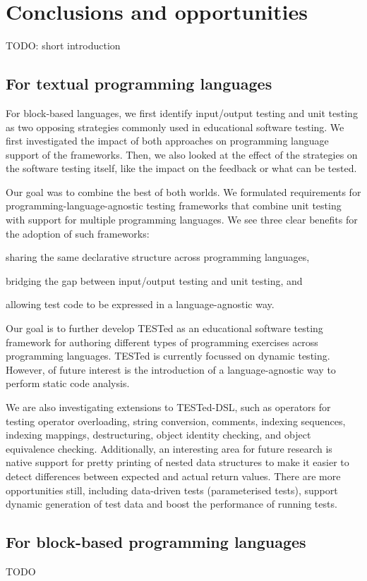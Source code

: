 \documentclass[main]{subfiles}
\begin{document}
\chapter{Conclusions and opportunities}\label{ch:conclusions-and-opportunities}

TODO: short introduction

\section{For textual programming languages}\label{sec:for-textual-programming-languages}

For block-based languages, we first identify input/output testing and unit testing as two opposing strategies commonly used in educational software testing.
We first investigated the impact of both approaches on programming language support of the frameworks.
Then, we also looked at the effect of the strategies on the software testing itself, like the impact on the feedback or what can be tested.

Our goal was to combine the best of both worlds.
We formulated requirements for programming-language-agnostic testing frameworks that combine unit testing with support for multiple programming languages.
We see three clear benefits for the adoption of such frameworks: \begin{enumerate*}[label=\emph{\roman*})] \item sharing the same declarative structure across programming languages, \item bridging the gap between input/output testing and unit testing, and \item allowing test code to be expressed in a language-agnostic way.\end{enumerate*}

Our goal is to further develop TESTed as an educational software testing framework for authoring different types of programming exercises across programming languages.
TESTed is currently focussed on dynamic testing.
However, of future interest is the introduction of a language-agnostic way to perform static code analysis.

We are also investigating extensions to TESTed-DSL, such as operators for testing operator overloading, string conversion, comments, indexing sequences, indexing mappings, destructuring, object identity checking, and object equivalence checking.
Additionally, an interesting area for future research is native support for pretty printing of nested data structures to make it easier to detect differences between expected and actual return values.
There are more opportunities still, including data-driven tests (parameterised tests), support dynamic generation of test data and boost the performance of running tests.

\section{For block-based programming languages}\label{sec:for-block-based-programming-languages}

TODO
\end{document}
